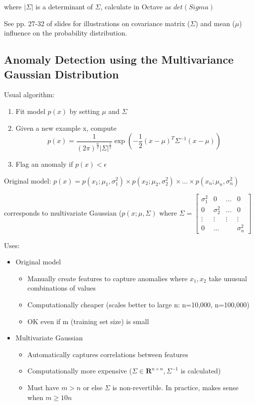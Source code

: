 \documentclass{scrartcl}
\begin{document}
where $|\Sigma|$ is a determinant of $\Sigma$, calculate in Octave as
$det(Sigma)$

See pp. 27-32 of slides for illustrations on covariance matrix
($\Sigma$) and mean ($\mu$) influence on the probability distribution.

\subsection{Anomaly Detection using the Multivariance Gaussian
  Distribution}
\label{sec:15-8}

Usual algorithm:
\begin{enumerate}
\item Fit model $p(x)$ by setting $\mu$ and $\Sigma$
\item Given a new example x, compute \[ p(x) = \frac{1}{(2
    \pi)^{\frac{n}{2}} |\Sigma|^{\frac{1}{2}}} \exp(-\frac{1}{2}(x -
  \mu)^T \Sigma^{-1}(x-\mu)) \]
\item Flag an anomaly if $p(x) < \epsilon$
\end{enumerate}

Original model: $p(x) = p(x_1; \mu_1, \sigma_1^2) \times p(x_2; \mu_2,
\sigma_2^2) \times \dots \times p(x_n; \mu_n, \sigma_n^2)$

corresponds to multivariate Gaussian ($p(x; \mu, \Sigma)$ where
$\Sigma = \left[
  \begin{array}{cccc}
    \sigma_1^2 & 0 & \dots & 0 \\
    0  & \sigma_2^2 & \dots &0 \\
    \vdots & \vdots & \vdots & \vdots \\
    0 & \dots & & \sigma_n^2 
  \end{array}
\right] $

Uses:
\begin{itemize}
\item Original model
  \begin{itemize}
  \item Manually create features to capture anomalies where $x_1, x_2$
    take unusual combinations of values
  \item Computationally cheaper (scales better to large n: n=10,000,
    n=100,000)
  \item OK even if m (training set size) is small
  \end{itemize}
\item Multivariate Gaussian
  \begin{itemize}
  \item Automatically captures correlations between features
  \item Computationally more expensive ($\Sigma \in \mathbf{R}^{n
      \times n}, \Sigma^{-1}$ is calculated)
  \item Must have $m > n$ or else $\Sigma$ is non-revertible. In
    practice, makes sense when $m \geq 10n$
  \end{itemize}
\end{itemize}
\end{document}
